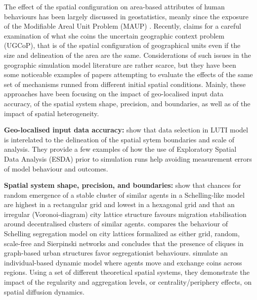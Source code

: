 \documentclass[Afour,sageh,times]{sagej}
\begin{document}
The effect of the spatial configuration on area-based attributes of human behaviours has been largely discussed in geostatistics, meanly since the exposure of the Modifiable Areal Unit Problem (MAUP) \citep{Openshaw1984,FotheringhamWong1991}. Recently, \citet{Kwan2012} claims for a careful examination of what she coins the uncertain geographic context problem (UGCoP), that is of the spatial configuration of geographical units even if the size and delineation of the area are the same. Considerations of such issues in the geographic simulation model literature are rather scarce, but they have been some noticeable examples of papers attempting to evaluate the effects of the same set of mechanisms runned from different initial spatial conditions. Mainly, these approaches have been focusing on the impact of geo-localised input data accuracy, of the spatial system shape, precision, and boundaries, as well as of the impact of spatial heterogeneity.

\textbf{Geo-localised input data accuracy:} \citep{Thomasetal2017} show that data selection in LUTI model is interelated to the delineation of the spatial sytem boundaries and scale of analysis. They provide a few examples of how the use of Exploratory Spatial Data Analysis (ESDA) prior to simulation runs help avoiding measurement errors of model behaviour and outcomes.

\textbf{Spatial system shape, precision, and boundaries:} \citet{FlacheHegselmann2001} show that chances for random emergence of a stable cluster of similar agents in a Schelling-like model are highest in a rectangular grid and lowest in a hexagonal grid and that an irregular (Voronoi-diagram) city lattice structure favours migration stabilisation around decentralised clusters of similar agents. \citet{Banos2012} compares the behaviour of Schelling segregation model on city lattices formalized as either grid, random, scale-free and Sierpinski networks and concludes that the presence of cliques in graph-based urban structures favor segregationist behaviours. \citet{LeTexierCaruso2017} simulate an individual-based dynamic model where agents move and exchange coins across regions. Using a set of different theoretical spatial systems, they demonstrate the impact of the regularity and aggregation levels, or centrality/periphery effects, on spatial diffusion dynamics.

\end{document}

